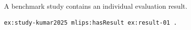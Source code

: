 A benchmark study contains an individual evaluation result.
\begin{lstlisting}[language=turtle]
ex:study-kumar2025 mlips:hasResult ex:result-01 .
\end{lstlisting}

